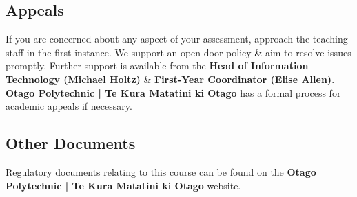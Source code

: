 \documentclass{article}
\begin{document}
\subsection*{Appeals}
If you are concerned about any aspect of your assessment, approach the teaching staff in the first instance. We support an open-door policy \& aim to resolve issues promptly. Further support is available from the \textbf{Head of Information Technology (Michael Holtz)} \& \textbf{First-Year Coordinator (Elise Allen)}. \textbf{Otago Polytechnic | Te Kura Matatini ki Otago} has a formal process for academic appeals if necessary.

\subsection*{Other Documents}
Regulatory documents relating to this course can be found on the \textbf{Otago Polytechnic | Te Kura Matatini ki Otago} website.
\end{document}
